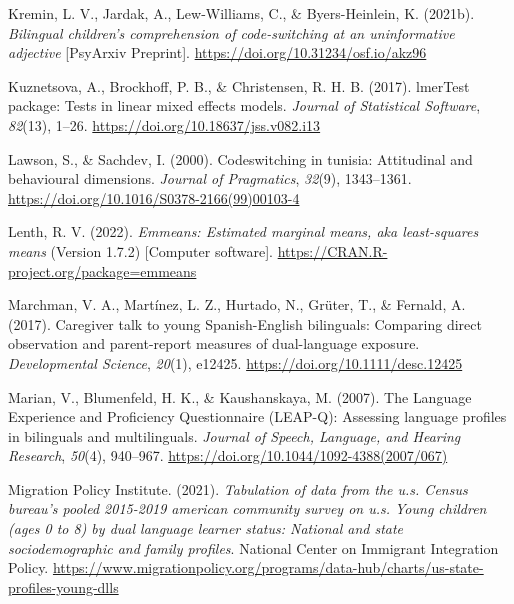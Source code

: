 \documentclass[
  man,floatsintext]{apa7}
\newlength{\cslhangindent}
\newlength{\cslentryspacingunit} %
\newenvironment{CSLReferences}[2] %
 {%
  \setlength{\parindent}{0pt}
  \ifodd #1
  \let\oldpar\par
  \def\par{\hangindent=\cslhangindent\oldpar}
  \fi
  \setlength{\parskip}{#2\cslentryspacingunit}
 }%
 {}
\begin{document}
\begin{CSLReferences}{1}{0}
\leavevmode{}%
Kremin, L. V., Jardak, A., Lew-Williams, C., \& Byers-Heinlein, K. (2021b). \emph{Bilingual children's comprehension of code-switching at an uninformative adjective} {[}PsyArxiv Preprint{]}. \url{https://doi.org/10.31234/osf.io/akz96}

\leavevmode{}%
Kuznetsova, A., Brockhoff, P. B., \& Christensen, R. H. B. (2017). lmerTest package: Tests in linear mixed effects models. \emph{Journal of Statistical Software}, \emph{82}(13), 1--26. \url{https://doi.org/10.18637/jss.v082.i13}

\leavevmode{}%
Lawson, S., \& Sachdev, I. (2000). Codeswitching in tunisia: Attitudinal and behavioural dimensions. \emph{Journal of Pragmatics}, \emph{32}(9), 1343--1361. \url{https://doi.org/10.1016/S0378-2166(99)00103-4}

\leavevmode{}%
Lenth, R. V. (2022). \emph{Emmeans: Estimated marginal means, aka least-squares means} (Version 1.7.2) {[}Computer software{]}. \url{https://CRAN.R-project.org/package=emmeans}

\leavevmode{}%
Marchman, V. A., Martínez, L. Z., Hurtado, N., Grüter, T., \& Fernald, A. (2017). Caregiver talk to young {Spanish-English} bilinguals: Comparing direct observation and parent-report measures of dual-language exposure. \emph{Developmental Science}, \emph{20}(1), e12425. \url{https://doi.org/10.1111/desc.12425}

\leavevmode{}%
Marian, V., Blumenfeld, H. K., \& Kaushanskaya, M. (2007). The {Language Experience and Proficiency Questionnaire} ({L}{E}{A}{P}-{Q}): Assessing language profiles in bilinguals and multilinguals. \emph{Journal of Speech, Language, and Hearing Research}, \emph{50}(4), 940--967. \url{https://doi.org/10.1044/1092-4388(2007/067)}

\leavevmode{}%
Migration Policy Institute. (2021). \emph{Tabulation of data from the u.s. Census bureau's pooled 2015-2019 american community survey on u.s. Young children (ages 0 to 8) by dual language learner status: National and state sociodemographic and family profiles}. National Center on Immigrant Integration Policy. \url{https://www.migrationpolicy.org/programs/data-hub/charts/us-state-profiles-young-dlls}


\end{CSLReferences}
\end{document}
